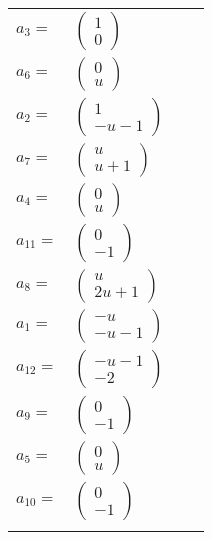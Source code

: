 \documentclass[1p]{elsarticle_modified}
\theoremstyle{definition}
\begin{document}
\begin{tabular}{m{7pt} m{180pt} m{7pt} m{180pt} }
\flushright $a_{3}=$&$\begin{pmatrix}1\\0\end{pmatrix}$ \\
\flushright $a_{6}=$&$\begin{pmatrix}0\\u\end{pmatrix}$ \\
\flushright $a_{2}=$&$\begin{pmatrix}1\\- u-1\end{pmatrix}$ \\
\flushright $a_{7}=$&$\begin{pmatrix}u\\u+1\end{pmatrix}$ \\
\flushright $a_{4}=$&$\begin{pmatrix}0\\u\end{pmatrix}$ \\
\flushright $a_{11}=$&$\begin{pmatrix}0\\-1\end{pmatrix}$ \\
\flushright $a_{8}=$&$\begin{pmatrix}u\\2 u+1\end{pmatrix}$ \\
\flushright $a_{1}=$&$\begin{pmatrix}- u\\- u-1\end{pmatrix}$ \\
\flushright $a_{12}=$&$\begin{pmatrix}- u-1\\-2\end{pmatrix}$ \\
\flushright $a_{9}=$&$\begin{pmatrix}0\\-1\end{pmatrix}$ \\
\flushright $a_{5}=$&$\begin{pmatrix}0\\u\end{pmatrix}$ \\
\flushright $a_{10}=$&$\begin{pmatrix}0\\-1\end{pmatrix}$\\&\end{tabular}
\end{document}
